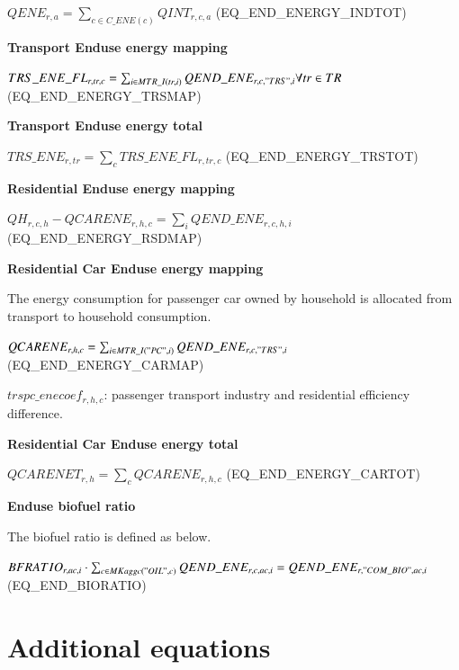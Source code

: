 \documentclass[10pt,a4paper,titlepage,dvipdfmx]{book}
\begin{document}
$QENE_{r,a}=\sum _{c\in C\_ ENE(c)}QINT_{r,c,a}$  (EQ\_END\_ENERGY\_INDTOT)

\begin{flushleft}\textbf{Transport Enduse energy mapping}\end{flushleft}

$TRS\_ ENE\_ FL_{r,tr,c}=\sum _{i\in MTR\_ I(tr,i)}QEND\_ ENE_{r,c,"TRS",i}\forall tr\in TR$ (EQ\_END\_ENERGY\_TRSMAP)

\begin{flushleft}\textbf{Transport Enduse energy total}\end{flushleft}

$TRS\_ ENE_{r,tr}=\sum _{c}TRS\_ ENE\_ FL_{r,tr,c}$  (EQ\_END\_ENERGY\_TRSTOT)

\begin{flushleft}\textbf{Residential Enduse energy mapping}\end{flushleft}

$QH_{r,c,h}-QCARENE_{r,h,c}=\sum _{i}QEND\_ ENE_{r,c,h,i}$ (EQ\_END\_ENERGY\_RSDMAP)

\begin{flushleft}\textbf{Residential Car Enduse energy mapping}\end{flushleft}

The energy consumption for passenger car owned by household is allocated from transport to household consumption. 

$QCARENE_{r,h,c}=\sum _{i\in MTR\_ I("PC",i)}QEND\_ ENE_{r,c,"TRS",i}$ (EQ\_END\_ENERGY\_CARMAP)

\begin{flushleft} $trspc\_ enecoef_{r,h,c}$: passenger transport industry and residential efficiency difference. \end{flushleft}

\begin{flushleft}\textbf{Residential Car Enduse energy total}\end{flushleft}

$QCARENET_{r,h}=\sum _{c} QCARENE_{r,h,c}$ (EQ\_END\_ENERGY\_CARTOT)

\begin{flushleft}\textbf{Enduse biofuel ratio}\end{flushleft}

The biofuel ratio is defined as below.

$BFRATIO_{r,ac,i}\cdot \sum _{c\in MKaggc("OIL",c)}QEND\_ ENE_{r,c,ac,i}=QEND\_ ENE_{r,"COM\_ BIO",ac,i}$ (EQ\_END\_BIORATIO)

\section{\label{sec:AddEqu}Additional equations}
\end{document}
